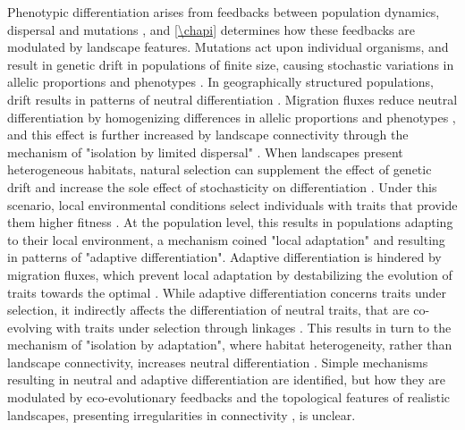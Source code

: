 Phenotypic differentiation arises from feedbacks between population dynamics, dispersal and mutations \citep{hamilton2021population}, and \cref{\chapi} determines how these feedbacks are modulated by landscape features.
% 
Mutations act upon individual organisms, and result in genetic drift in populations of finite size, causing stochastic variations in allelic proportions and phenotypes \citep{Slatkin1987a}. 
% 
In geographically structured populations, drift results in patterns of neutral differentiation \citep{Slatkin1987a}. 
% 
Migration fluxes reduce neutral differentiation by homogenizing differences in allelic proportions and phenotypes \citep{Slatkin1987a}, and this effect is further increased by landscape connectivity \citep{Wright1943,McRae2006,McRae2007} through the mechanism of "isolation by limited dispersal" \citep{Lande1991,Orsini2013}.
% 
When landscapes present heterogeneous habitats, natural selection can supplement the effect of genetic drift and increase the sole effect of stochasticity on differentiation \citep{fisher1958genetical}. Under this scenario, local environmental conditions select individuals with traits that provide them higher fitness \citep{Gaither2018}. At the population level, this results in populations adapting to their local environment, a mechanism coined "local adaptation" \citep{Kawecki2004} and resulting in patterns of "adaptive differentiation". 
% 
Adaptive differentiation is hindered by migration fluxes, which prevent local adaptation by destabilizing the evolution of traits towards the optimal \citep{Meszena1997,Debarre2013,Mirrahimi2020}.
% 
While adaptive differentiation concerns traits under selection, it indirectly affects the differentiation of neutral traits, that are co-evolving with traits under selection through linkages \citep{Billiard2015,Lepers2021}. This results in turn to the mechanism of "isolation by adaptation", where habitat heterogeneity, rather than landscape connectivity, increases neutral differentiation \citep{nosil2008}. 
% 
Simple mechanisms resulting in neutral and adaptive differentiation are identified, but how they are modulated by eco-evolutionary feedbacks and the topological features of realistic landscapes, presenting irregularities in connectivity \citep{Dale2010,LiebermanHauert2005}, is unclear. %


